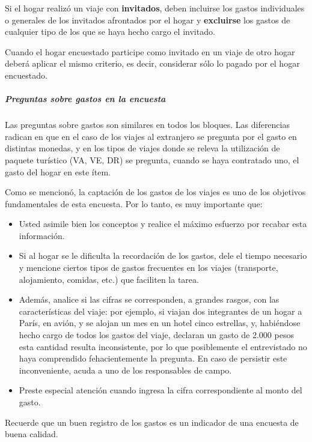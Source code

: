 \documentclass[
  openany]{book}
\begin{document}
Si el hogar realizó un viaje con \textbf{invitados}, deben incluirse los gastos individuales o generales de los invitados afrontados por el hogar y \textbf{excluirse} los gastos de cualquier tipo de los que se haya hecho cargo el invitado.

Cuando el hogar encuestado participe como invitado en un viaje de otro hogar deberá aplicar el mismo criterio, es decir, considerar sólo lo pagado por el hogar encuestado.

\hypertarget{preguntas-sobre-gastos-en-la-encuesta}{%
\subparagraph{Preguntas sobre gastos en la encuesta}\label{preguntas-sobre-gastos-en-la-encuesta}}

Las preguntas sobre gastos son similares en todos los bloques. Las diferencias radican en que en el caso de los viajes al extranjero se pregunta por el gasto en distintas monedas, y en los tipos de viajes donde se releva la utilización de paquete turístico (VA, VE, DR) se pregunta, cuando se haya contratado uno, el gasto del hogar en este ítem.

Como se mencionó, la captación de los gastos de los viajes es uno de los objetivos fundamentales de esta encuesta. Por lo tanto, es muy importante que:

\begin{itemize}
\item
  Usted asimile bien los conceptos y realice el máximo esfuerzo por recabar esta información.
\item
  Si al hogar se le dificulta la recordación de los gastos, dele el tiempo necesario y mencione ciertos tipos de gastos frecuentes en los viajes (transporte, alojamiento, comidas, etc.) que faciliten la tarea.
\item
  Además, analice si las cifras se corresponden, a grandes rasgos, con las características del viaje: por ejemplo, si viajan dos integrantes de un hogar a París, en avión, y se alojan un mes en un hotel cinco estrellas, y, habiéndose hecho cargo de todos los gastos del viaje, declaran un gasto de 2.000 pesos esta cantidad resulta inconsistente, por lo que posiblemente el entrevistado no haya comprendido fehacientemente la pregunta. En caso de persistir este inconveniente, acuda a uno de los responsables de campo.
\item
  Preste especial atención cuando ingresa la cifra correspondiente al monto del gasto.
\end{itemize}

Recuerde que un buen registro de los gastos es un indicador de una encuesta de buena calidad.
\end{document}

